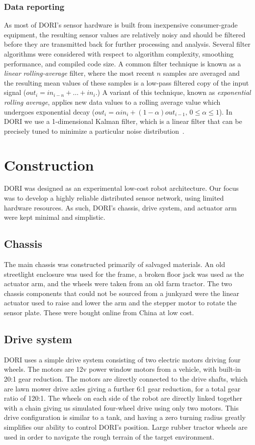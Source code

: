         \subsection{Data reporting}
        As most of DORI's sensor hardware is built from inexpensive consumer-grade equipment, the resulting sensor values are relatively noisy and should be filtered before they are transmitted back for further processing and analysis. Several filter algorithms were considered with respect to algorithm complexity, smoothing performance, and compiled code size. A common filter technique is known as a \emph{linear rolling-average} filter, where the most recent $n$ samples are averaged and the resulting mean values of these samples is a low-pass filtered copy of the input signal ($\mathit{out}_i = \mathit{in}_{i-n} + \ldots + \mathit{in}_{i}$.) A variant of this technique, known as \emph{exponential rolling average}, applies new data values to a rolling average value which undergoes exponential decay ($\mathit{out}_i = \alpha \mathit{in}_i + (1 - \alpha) \mathit{out}_{i-1}, \,0 \le \alpha \le 1$). In DORI we use a 1-dimensional Kalman filter, which is a linear filter that can be precisely tuned to minimize a particular noise distribution~\cite{kalman}.

\chapter{Construction}
    DORI was designed as an experimental low-cost robot architecture. Our focus was to develop a highly reliable distributed sensor network, using limited hardware resources. As such, DORI's chassis, drive system, and actuator arm were kept minimal and simplistic.
    \section{Chassis}
The main chassis was constructed primarily of salvaged materials. An old streetlight enclosure was used for the frame, a broken floor jack was used as the actuator arm, and the wheels were taken from an old farm tractor. The two chassis components that could not be sourced from a junkyard were the linear actuator used to raise and lower the arm and the stepper motor to rotate the sensor plate. These were bought online from China at low cost.

    \section{Drive system}
    DORI uses a simple drive system consisting of two electric motors driving four wheels. The motors are 12v power window motors from a vehicle, with built-in 20:1 gear reduction. The motors are directly connected to the drive shafts, which are lawn mower drive axles giving a further 6:1 gear reduction, for a total gear ratio of 120:1. The wheels on each side of the robot are directly linked together with a chain giving us simulated four-wheel drive using only two motors. This drive configuration is similar to a tank, and having a zero turning radius greatly simplifies our ability to control DORI's position. Large rubber tractor wheels are used in order to navigate the rough terrain of the target environment.

